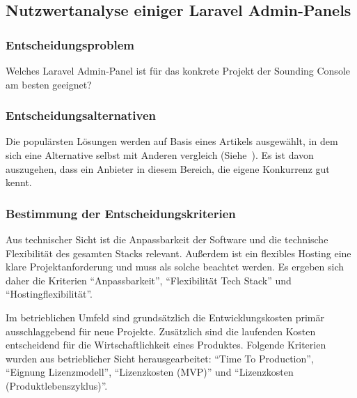\newpage

\subsection{Nutzwertanalyse einiger Laravel Admin-Panels}

\subsubsection{Entscheidungsproblem}
Welches Laravel Admin-Panel ist für das konkrete Projekt der Sounding Console am besten geeignet?

\subsubsection{Entscheidungsalternativen}
Die populärsten Lösungen werden auf Basis eines Artikels ausgewählt, in dem sich eine Alternative selbst mit Anderen vergleich (Siehe~\cite{the-guide-to-laravel-admin-panels}).
Es ist davon auszugehen, dass ein Anbieter in diesem Bereich, die eigene Konkurrenz gut kennt.

\subsubsection{Bestimmung der Entscheidungskriterien}
Aus technischer Sicht ist die Anpassbarkeit der Software und die technische Flexibilität des gesamten Stacks relevant.
Außerdem ist ein flexibles Hosting eine klare Projektanforderung und muss als solche beachtet werden.
Es ergeben sich daher die Kriterien \enquote{Anpassbarkeit}, \enquote {Flexibilität Tech Stack} und \enquote{Hostingflexibilität}.

Im betrieblichen Umfeld sind grundsätzlich die Entwicklungskosten primär ausschlaggebend für neue Projekte.
Zusätzlich sind die laufenden Kosten entscheidend für die Wirtschaftlichkeit eines Produktes.
Folgende Kriterien wurden aus betrieblicher Sicht herausgearbeitet: \enquote{Time To Production}, \enquote{Eignung Lizenzmodell}, \enquote{Lizenzkosten (MVP)} und \enquote{Lizenzkosten (Produktlebenszyklus)}.

